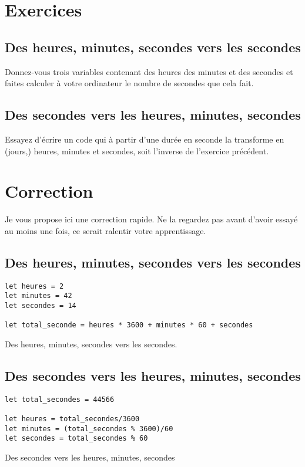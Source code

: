 \section*{Exercices}
{}
\subsection*{Des heures, minutes, secondes vers les secondes}
{}
Donnez-vous trois variables contenant des heures des minutes et des secondes
et faites calculer à votre ordinateur le nombre de secondes que cela fait.


\subsection*{Des secondes vers les heures, minutes, secondes}
{} 
Essayez d'écrire un code qui à partir d'une durée en seconde la transforme en (jours,) heures, minutes et secondes, soit l'inverse de l'exercice précédent.

\pagebreak %

\section*{Correction}
{}
Je vous propose ici une correction rapide. Ne la regardez pas avant d'avoir essayé au moins une fois, ce serait ralentir votre apprentissage.
\subsection*{Des heures, minutes, secondes vers les secondes}
{}
\begin{listing}[h]
\begin{verbatim}
let heures = 2
let minutes = 42
let secondes = 14

let total_seconde = heures * 3600 + minutes * 60 + secondes
\end{verbatim}
\caption{Des heures, minutes, secondes vers les secondes.}
\end{listing}

\subsection*{Des secondes vers les heures, minutes, secondes}
{} 
\begin{listing}[h]
\begin{verbatim}
let total_secondes = 44566

let heures = total_secondes/3600
let minutes = (total_secondes % 3600)/60
let secondes = total_secondes % 60
\end{verbatim}
\caption{Des secondes vers les heures, minutes, secondes}
\end{listing}
